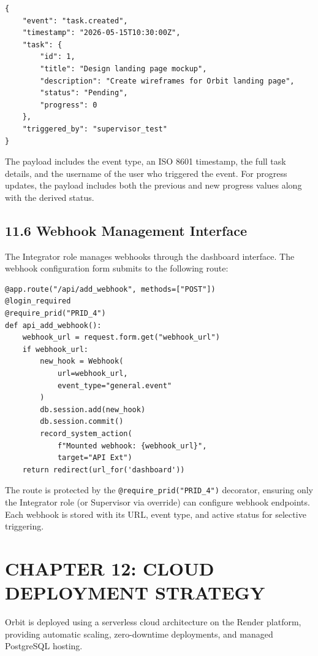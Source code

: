 ﻿\documentclass[12pt]{article}
\def\normaltext{\fontsize{12pt}{18pt}\color{secondary}}
\begin{document}
\begin{lstlisting}[style=pycode]
{
    "event": "task.created",
    "timestamp": "2026-05-15T10:30:00Z",
    "task": {
        "id": 1,
        "title": "Design landing page mockup",
        "description": "Create wireframes for Orbit landing page",
        "status": "Pending",
        "progress": 0
    },
    "triggered_by": "supervisor_test"
}
\end{lstlisting}

The payload includes the event type, an ISO 8601 timestamp, the full task details, and the username of the user who triggered the event. For progress updates, the payload includes both the previous and new progress values along with the derived status.

\subsection*{11.6 Webhook Management Interface}
The Integrator role manages webhooks through the dashboard interface. The webhook configuration form submits to the following route:

\begin{lstlisting}[style=pycode]
@app.route("/api/add_webhook", methods=["POST"])
@login_required
@require_prid("PRID_4")
def api_add_webhook():
    webhook_url = request.form.get("webhook_url")
    if webhook_url:
        new_hook = Webhook(
            url=webhook_url,
            event_type="general.event"
        )
        db.session.add(new_hook)
        db.session.commit()
        record_system_action(
            f"Mounted webhook: {webhook_url}",
            target="API Ext")
    return redirect(url_for('dashboard'))
\end{lstlisting}

The route is protected by the \texttt{@require\_prid("PRID\_4")} decorator, ensuring only the Integrator role (or Supervisor via override) can configure webhook endpoints. Each webhook is stored with its URL, event type, and active status for selective triggering.
\newpage

\section*{{\color{primary}CHAPTER 12: CLOUD DEPLOYMENT STRATEGY}}
\normaltext
Orbit is deployed using a serverless cloud architecture on the Render platform, providing automatic scaling, zero-downtime deployments, and managed PostgreSQL hosting.
\end{document}
